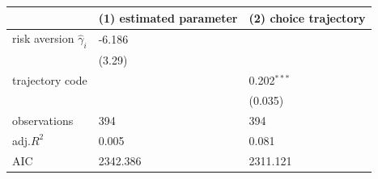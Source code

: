 \begin{tabular}{lll}
\hline
 & (1) estimated parameter & (2) choice trajectory \\
\hline
risk aversion $\hat{\gamma}_i$ & -6.186 &  \\
 & (3.29) &  \\
trajectory code &  & 0.202$^{***}$ \\
 &  & (0.035) \\
observations & 394 & 394 \\
adj.$R^2$ & 0.005 & 0.081 \\
AIC & 2342.386 & 2311.121 \\
\hline
\end{tabular}
